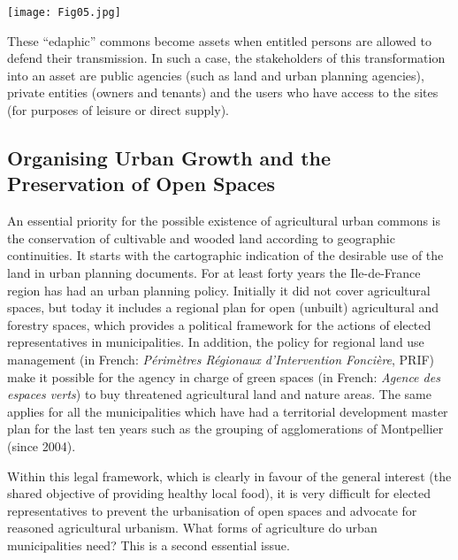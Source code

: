 \documentclass[10pt,a4paper]{article}
\begin{document}
\begin{multicols}{2}
\vspace{\baselineskip}

\noindent
\begin{minipage}{\columnwidth}
\centering
\resizebox{\columnwidth}{!}
{\texttt{[image: Fig05.jpg]}}
\end{minipage}

These ``edaphic'' commons become assets when entitled persons are allowed to defend their transmission. In such a case, the stakeholders of this transformation into an asset are public agencies (such as land and urban planning agencies), private entities (owners and tenants) and the users who have access to the sites (for purposes of leisure or direct supply). 

\subsection{Organising Urban Growth and the Preservation of Open Spaces}
\noindent An essential priority for the possible existence of agricultural urban commons is the conservation of cultivable and wooded land according to geographic continuities. It starts with the cartographic indication of the desirable use of the land in urban planning documents. For at least forty years the Ile-de-France region has had an urban planning policy. Initially it did not cover agricultural spaces, but today it includes a regional plan for open (unbuilt) agricultural and forestry spaces, which provides a political framework for the actions of elected representatives in municipalities. In addition, the policy for regional land use management (in French: \textit{Périmètres Régionaux d’Intervention Foncière}, PRIF) make it possible for the agency in charge of green spaces (in French: \textit{Agence des espaces verts}) to buy threatened agricultural land and nature areas. The same applies for all the municipalities which have had a territorial development master plan for the last ten years such as the grouping of agglomerations of Montpellier (since 2004).

Within this legal framework, which is clearly in favour of the general interest (the shared objective of providing healthy local food), it is very difficult for elected representatives to prevent the urbanisation of open spaces and advocate for reasoned agricultural urbanism. What forms of agriculture do urban municipalities need? This is a second essential issue.


\end{multicols}
\end{document}
